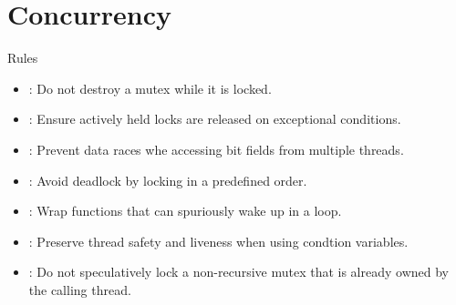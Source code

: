 \section{Concurrency}

\begin{frame}[t]{Rules}
\begin{itemize}
  \item {}: 
        Do not destroy a mutex while it is locked.
  \vfill
  \item {}: 
        Ensure actively held locks are released on exceptional conditions.
  \vfill
  \item {}: 
        Prevent data races whe accessing bit fields from multiple threads.
  \vfill
  \item {}: 
        Avoid deadlock by locking in a predefined order.
  \vfill
  \item {}: 
        Wrap functions that can spuriously wake up in a loop.
  \vfill
  \item {}: 
        Preserve thread safety and liveness when using condtion variables.
  \vfill
  \item {}: 
        Do not speculatively lock a non-recursive mutex that is already owned by the calling thread.
\end{itemize}
\end{frame}


